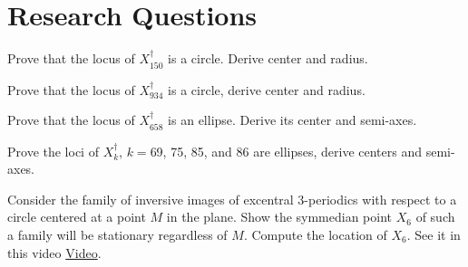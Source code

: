 \section{Research Questions}

\begin{question}
Prove that the locus of $X_{150}^\dagger$ is a circle. Derive center and radius.
\label{que:08-x150}
\end{question}

\begin{question}
Prove that the locus of $X_{934}^\dagger$ is a circle, derive center and radius.
\end{question}

\begin{question}
Prove that the locus of $X_{658}^\dagger$ is an ellipse. Derive its center and semi-axes.
\end{question}

\begin{question}
Prove the loci of $X_k^\dagger$, $k=$69, 75, 85, and 86 are ellipses, derive centers and semi-axes.
\end{question}

\begin{question}
Consider the family of inversive images of excentral 3-periodics with respect to a circle centered at a point $M$ in the plane. Show the symmedian point $X_6$ of such a family will be stationary regardless of $M$. Compute the location of $X_6$. See it in this video \href{https://youtu.be/wwX_QfkjVi0}{Video}.
\end{question}